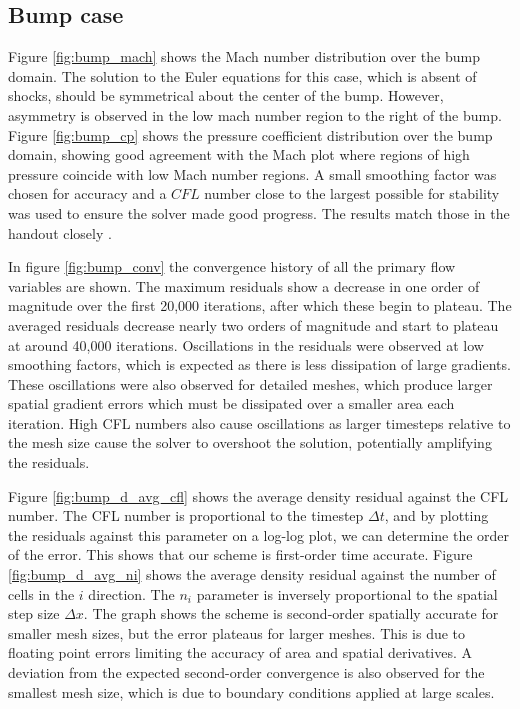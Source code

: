 \documentclass{article}
\begin{document}
\subsection{Bump case}

Figure \ref{fig:bump_mach} shows the Mach number distribution over the bump domain.
The solution to the Euler equations for this case, which is absent of shocks, should be symmetrical about the center of the bump.
However, asymmetry is observed in the low mach number region to the right of the bump.
Figure \ref{fig:bump_cp} shows the pressure coefficient distribution over the bump domain, showing good agreement with
the Mach plot where regions of high pressure coincide with low Mach number regions.
A small smoothing factor was chosen for accuracy and a $CFL$ number close to the largest possible for stability  was used to ensure the solver made good progress.
The results match those in the handout closely \cite{handout}.

In figure \ref{fig:bump_conv} the convergence history of all the primary flow variables are shown.
The maximum residuals show a decrease in one order of magnitude over the first 20,000 iterations, after which these begin to plateau.
The averaged residuals decrease nearly two orders of magnitude and start to plateau at around 40,000 iterations.
Oscillations in the residuals were observed at low smoothing factors, which is expected as there is less dissipation of large gradients.
These oscillations were also observed for detailed meshes, which produce larger spatial gradient errors which must be dissipated over a smaller area each iteration.
High CFL numbers also cause oscillations as larger timesteps relative to the mesh size cause the solver to overshoot the solution, potentially amplifying the residuals.

Figure \ref{fig:bump_d_avg_cfl} shows the average density residual against the CFL number.
The CFL number is proportional to the timestep $\Delta t$, and by plotting the residuals against this parameter on a log-log plot, we can determine the order of the error.
This shows that our scheme is first-order time accurate.
Figure \ref{fig:bump_d_avg_ni} shows the average density residual against the number of cells in the $i$ direction.
The $n_i$ parameter is inversely proportional to the spatial step size $\Delta x$.
The graph shows the scheme is second-order spatially accurate for smaller mesh sizes, but the error plateaus for larger meshes.
This is due to floating point errors limiting the accuracy of area and spatial derivatives.
A deviation from the expected second-order convergence is also observed for the smallest mesh size,
which is due to boundary conditions applied at large scales. 
\end{document}
